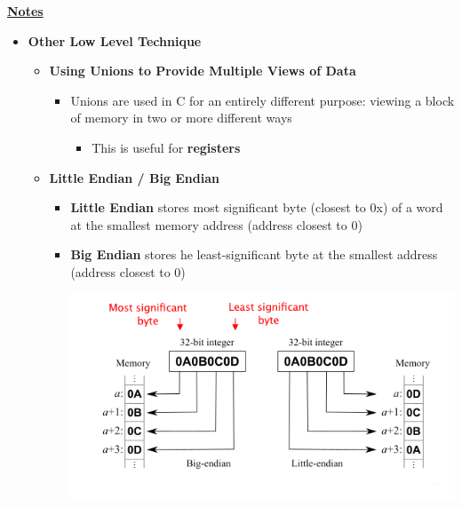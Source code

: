 \documentclass[12pt]{article}
\begin{document}
\begin{enumerate}[1.]
\begin{mdframed}
    \end{mdframed}

    \bigskip

    \underline{\textbf{Notes}}

    \begin{itemize}
        \item \textbf{Other Low Level Technique}

        \begin{itemize}
            \item \textbf{Using Unions to Provide Multiple Views of Data}

            \begin{itemize}
                \item Unions are used in C for an entirely different purpose:
                viewing a block of memory in two or more different ways

                \begin{itemize}
                    \item This is useful for \textbf{registers}
                \end{itemize}

            \end{itemize}

            \item \textbf{Little Endian / Big Endian}

            \begin{itemize}
                \item \textbf{Little Endian} stores most significant byte (closest to 0x) of a word at the smallest memory address (address closest to 0)
                \item \textbf{Big Endian} stores he least-significant byte at the smallest address (address closest to 0)

                \bigskip

                \begin{center}
                \includegraphics[width=\linewidth]{images/review_9_solution_12.png}
                \end{center}
            \end{itemize}


\end{itemize}
\end{itemize}
\end{enumerate}
\end{document}
